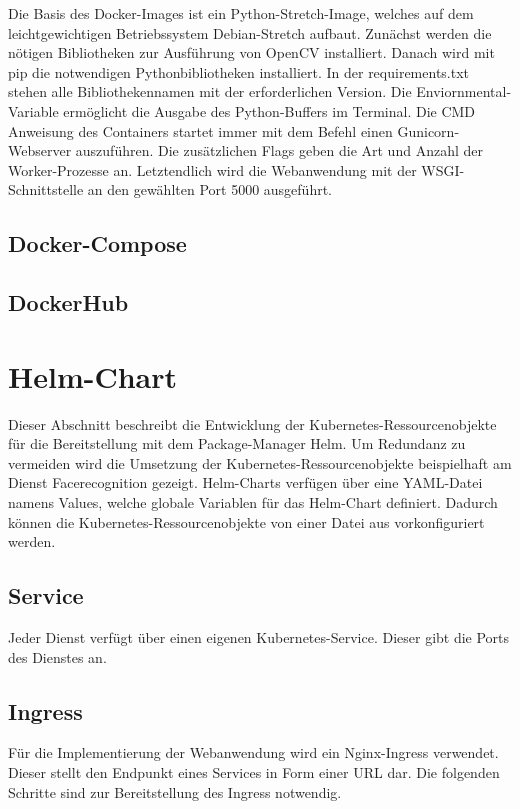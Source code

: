 Die Basis des Docker-Images ist ein Python-Stretch-Image, welches auf dem leichtgewichtigen Betriebssystem Debian-Stretch aufbaut.
Zunächst werden die nötigen Bibliotheken zur Ausführung von OpenCV installiert.
Danach wird mit pip die notwendigen Pythonbibliotheken installiert.
In der requirements.txt stehen alle Bibliothekennamen mit der erforderlichen Version.
Die Enviornmental-Variable ermöglicht die Ausgabe des Python-Buffers im Terminal.
Die CMD Anweisung des Containers startet immer mit dem Befehl einen Gunicorn-Webserver auszuführen.
Die zusätzlichen Flags geben die Art und Anzahl der Worker-Prozesse an.
Letztendlich wird die Webanwendung mit der WSGI-Schnittstelle an den gewählten Port 5000 ausgeführt.

\subsection{Docker-Compose}



\subsection{DockerHub}

\section{Helm-Chart}
Dieser Abschnitt beschreibt die Entwicklung der Kubernetes-Ressourcenobjekte für die Bereitstellung mit dem Package-Manager Helm.
Um Redundanz zu vermeiden wird die Umsetzung der Kubernetes-Ressourcenobjekte beispielhaft am Dienst Facerecognition gezeigt.
Helm-Charts verfügen über eine YAML-Datei namens Values, welche globale Variablen für das Helm-Chart definiert.
Dadurch können die Kubernetes-Ressourcenobjekte von einer Datei aus vorkonfiguriert werden.


\subsection{Service}
Jeder Dienst verfügt über einen eigenen Kubernetes-Service.
Dieser gibt die Ports des Dienstes an.

\subsection{Ingress}

Für die Implementierung der Webanwendung wird ein Nginx-Ingress verwendet.
Dieser stellt den Endpunkt eines Services in Form einer URL dar.
Die folgenden Schritte sind zur Bereitstellung des Ingress notwendig.



